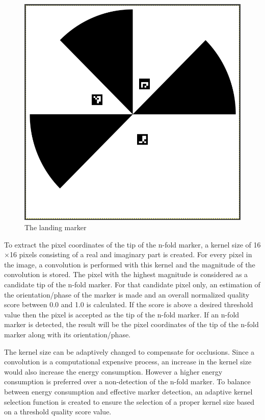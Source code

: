 \documentclass[conference]{IEEEtran}
\begin{document}
\begin{figure}[h]
\centering
\includegraphics[scale=0.15]{n-fold-for-landing.png}
\caption{The landing marker}
\label{fig:LandingMarker}
\end{figure}

To extract the pixel coordinates of the tip of the n-fold marker, a kernel size of 16$\times$16 pixels consisting of a real and imaginary part is created. For every pixel in the image, a convolution is performed with this kernel and the magnitude of the convolution is stored. The pixel with the highest magnitude is considered as a candidate tip of the n-fold marker. For that candidate pixel only, an estimation of the orientation/phase of the marker is made and an overall normalized quality score between 0.0 and 1.0 is calculated. If the score is above a desired threshold value then the pixel is accepted as the tip of the n-fold marker. If an n-fold marker is detected, the result will be the pixel coordinates of the tip of the n-fold marker along with its orientation/phase. 

The kernel size can be adaptively changed to compensate for occlusions. Since a convolution is a computational  expensive process, an increase in the kernel size would also increase the energy consumption. However a higher energy consumption is preferred over a non-detection of the n-fold marker. To balance between energy consumption and effective marker detection, an adaptive kernel selection function is created to ensure the selection of a proper kernel size based on a threshold quality score value.
\end{document}
